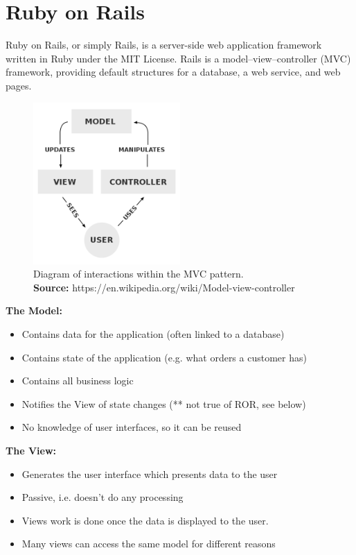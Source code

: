\section{Ruby on Rails} 
Ruby on Rails, or simply Rails, is a server-side web application framework written in Ruby under the MIT License. Rails is a model–view–controller (MVC) framework, providing default structures for a database, a web service, and web pages. \cite{wiki:RoR}

\begin{figure}[H]
	\centering
    \includegraphics[trim={0 0 0 0},clip,width=0.5\textwidth]{Files/MVC.png}
    \caption{Diagram of interactions within the MVC pattern.\\ \textbf{Source:} https://en.wikipedia.org/wiki/Model-view-controller}
    \label{fig: MVC}
\end{figure}




\textbf{The Model:}
\vspace{-5mm}
\begin{itemize}
 \setlength{\itemsep}{-5pt}
\item Contains data for the application (often linked to a database)
\item Contains state of the application (e.g. what orders a customer has)
\item  Contains all business logic
\item Notifies the View of state changes (** not true of ROR, see below)
\item No knowledge of user interfaces, so it can be reused
\end{itemize}

\textbf{The View:}
\vspace{-5mm}
\begin{itemize}
 \setlength{\itemsep}{-5pt}
\item Generates the user interface which presents data to the user
\item Passive, i.e. doesn’t do any processing
\item Views work is done once the data is displayed to the user.
\item Many views can access the same model for different reasons
\end{itemize}

